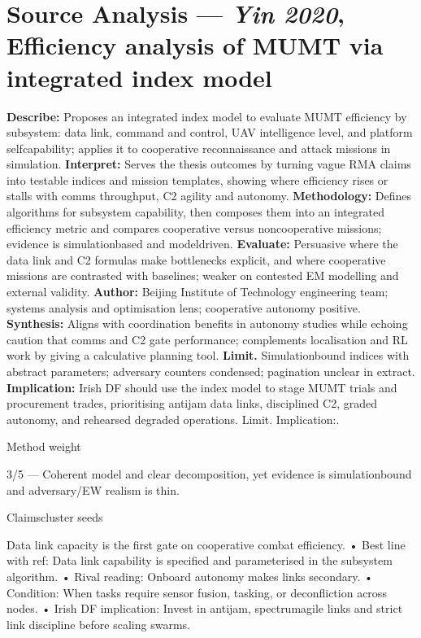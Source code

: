 \section*{Source Analysis — \textit{Yin 2020}, Efficiency analysis of MUM\textendash T via integrated index model}
\textbf{Describe:} Proposes an integrated index model to evaluate MUM\textendash T efficiency by subsystem: data link, command and control, UAV intelligence level, and platform self\textendash capability; applies it to cooperative reconnaissance and attack missions in simulation.
\textbf{Interpret:} Serves the thesis outcomes by turning vague RMA claims into testable indices and mission templates, showing where efficiency rises or stalls with comms throughput, C2 agility and autonomy.
\textbf{Methodology:} Defines algorithms for subsystem capability, then composes them into an integrated efficiency metric and compares cooperative versus non\textendash cooperative missions; evidence is simulation\textendash based and model\textendash driven.
\textbf{Evaluate:} Persuasive where the data link and C2 formulas make bottlenecks explicit, and where cooperative missions are contrasted with baselines; weaker on contested EM modelling and external validity.
\textbf{Author:} Beijing Institute of Technology engineering team; systems analysis and optimisation lens; cooperative autonomy positive.
\textbf{Synthesis:} Aligns with coordination benefits in autonomy studies while echoing caution that comms and C2 gate performance; complements localisation and RL work by giving a calculative planning tool.
\textbf{Limit.} Simulation\textendash bound indices with abstract parameters; adversary counters condensed; pagination unclear in extract.
\textbf{Implication:} Irish DF should use the index model to stage MUM\textendash T trials and procurement trades, prioritising anti\textendash jam data links, disciplined C2, graded autonomy, and rehearsed degraded operations. Limit. Implication:.

Method weight

3/5 — Coherent model and clear decomposition, yet evidence is simulation\textendash bound and adversary/EW realism is thin.

Claims\textendash cluster seeds

Data link capacity is the first gate on cooperative combat efficiency.
• Best line with ref: Data link capability is specified and parameterised in the subsystem algorithm.
• Rival reading: Onboard autonomy makes links secondary.
• Condition: When tasks require sensor fusion, tasking, or deconfliction across nodes.
• Irish DF implication: Invest in anti\textendash jam, spectrum\textendash agile links and strict link discipline before scaling swarms.

